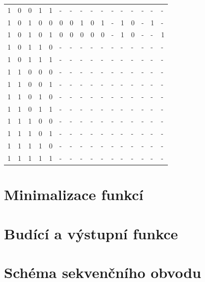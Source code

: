\documentclass[titlepage]{article}
\begin{document}
\begin{center}
\begin{tabular}{|l|l|l|l|l|l|l|l|l|l|l|l|l|l|l|l|}
1 & 0 & 0 & 1 & 1 & - & - & - & - & - & - & - & - & - & - & - \\
1 & 0 & 1 & 0 & 0 & 0 & 0 & 1 & 0 & 1 & - & 1 & 0 & - & 1 & - \\
1 & 0 & 1 & 0 & 1 & 0 & 0 & 0 & 0 & 0 & - & 1 & 0 & - & - & 1 \\
1 & 0 & 1 & 1 & 0 & - & - & - & - & - & - & - & - & - & - & - \\
1 & 0 & 1 & 1 & 1 & - & - & - & - & - & - & - & - & - & - & - \\
1 & 1 & 0 & 0 & 0 & - & - & - & - & - & - & - & - & - & - & - \\
1 & 1 & 0 & 0 & 1 & - & - & - & - & - & - & - & - & - & - & - \\
1 & 1 & 0 & 1 & 0 & - & - & - & - & - & - & - & - & - & - & - \\
1 & 1 & 0 & 1 & 1 & - & - & - & - & - & - & - & - & - & - & - \\
1 & 1 & 1 & 0 & 0 & - & - & - & - & - & - & - & - & - & - & - \\
1 & 1 & 1 & 0 & 1 & - & - & - & - & - & - & - & - & - & - & - \\
1 & 1 & 1 & 1 & 0 & - & - & - & - & - & - & - & - & - & - & - \\
1 & 1 & 1 & 1 & 1 & - & - & - & - & - & - & - & - & - & - & - \\

\hline
\end{tabular}
\end{center}
\section{Minimalizace funkcí}
\section{Budící a výstupní funkce}
\section{Schéma sekvenčního obvodu}
\end{document}
